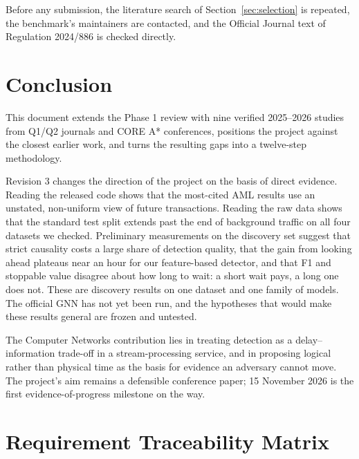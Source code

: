 \documentclass[11pt,a4paper]{article}
\begin{document}
Before any submission, the literature search of Section~\ref{sec:selection} is repeated, the benchmark's maintainers are contacted, and the Official Journal text of Regulation 2024/886 is checked directly.

\section{Conclusion}
\label{sec:conclusion}

This document extends the Phase 1 review with nine verified 2025--2026 studies from Q1/Q2 journals and CORE A* conferences, positions the project against the closest earlier work, and turns the resulting gaps into a twelve-step methodology.

Revision 3 changes the direction of the project on the basis of direct evidence. Reading the released code shows that the most-cited AML results use an unstated, non-uniform view of future transactions. Reading the raw data shows that the standard test split extends past the end of background traffic on all four datasets we checked. Preliminary measurements on the discovery set suggest that strict causality costs a large share of detection quality, that the gain from looking ahead plateaus near an hour for our feature-based detector, and that F1 and stoppable value disagree about how long to wait: a short wait pays, a long one does not. These are discovery results on one dataset and one family of models. The official GNN has not yet been run, and the hypotheses that would make these results general are frozen and untested.

The Computer Networks contribution lies in treating detection as a delay--information trade-off in a stream-processing service, and in proposing logical rather than physical time as the basis for evidence an adversary cannot move. The project's aim remains a defensible conference paper; 15 November 2026 is the first evidence-of-progress milestone on the way.

\appendix

\section{Requirement Traceability Matrix}
\label{app:traceability}
\end{document}
